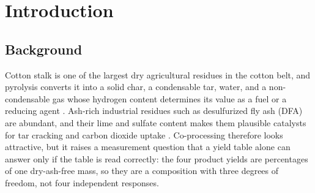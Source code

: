 \documentclass[withoutpreface,bwprint]{apmcmthesis}
\begin{document}
\begin{abstract}
\textbf{Validation and Limitation} Mass closure holds to machine precision, and every reported number is recomputed from the stored result files. A perturbation audit of the fitted parameters and the query points leaves a single headline reversal, 6.67 percent of the feasible model runs. The main limitation is that neither annex reports the pyrolysis temperature, so the kinetics reduce to an iso-conversion ridge and no rate law is identified; the CE and LG series also show a lack-of-fit ratio of 3.42 or more, which marks their predictions as trend-only.

\end{abstract}

\newpage
\setcounter{tocdepth}{1}
\tableofcontents
\newpage
\pagestyle{mainmatterstyle}
\setcounter{page}{1}

\section{Introduction}
\subsection{Background}
Cotton stalk is one of the largest dry agricultural residues in the cotton belt, and pyrolysis converts it into a solid char, a condensable tar, water, and a non-condensable gas whose hydrogen content determines its value as a fuel or a reducing agent \cite{Bridgwater2012,Czernik2004}. Ash-rich industrial residues such as desulfurized fly ash (DFA) are abundant, and their lime and sulfate content makes them plausible catalysts for tar cracking and carbon dioxide uptake \cite{Sutton2001,Blamey2010}. Co-processing therefore looks attractive, but it raises a measurement question that a yield table alone can answer only if the table is read correctly: the four product yields are percentages of one dry-ash-free mass, so they are a composition with three degrees of freedom, not four independent responses.
\end{document}
